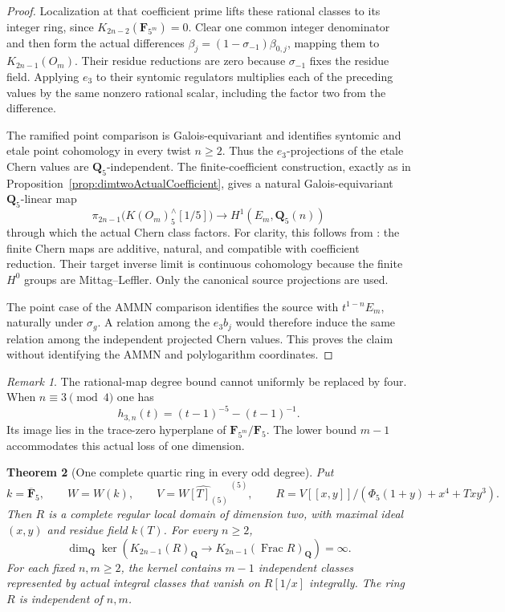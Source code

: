 \documentclass[11pt,a4paper]{article}
\newtheorem{theorem}{Theorem}[section]
\theoremstyle{remark}
\newtheorem{remark}[theorem]{Remark}
\begin{document}
\begin{proof}
Localization at that coefficient prime lifts these rational
classes to its integer ring, since
$K_{2n-2}(\mathbf F_{5^m})=0$.
Clear one common integer denominator and then form the actual
differences
$\beta_j=(1-\sigma_{-1})\beta_{0,j}$, mapping them to $K_{2n-1}(O_m)$.
Their residue reductions are zero because $\sigma_{-1}$ fixes
the residue field.  Applying $e_3$ to their syntomic regulators
multiplies each of the preceding values by the same nonzero
rational scalar, including the factor two from the difference.

The ramified point comparison
\cite[Example~2.2.4 and Propositions~2.2.7, 2.2.9, 2.3.4]{HuberKings}
is Galois-equivariant and identifies syntomic and etale point
cohomology in every twist $n\geq2$.  Thus the $e_3$-projections
of the etale Chern values are $\mathbf Q_5$-independent.
The finite-coefficient construction, exactly as in
Proposition~\ref{prop:dimtwoActualCoefficient}, gives a natural
Galois-equivariant $\mathbf Q_5$-linear map
\[
 \pi_{2n-1}\bigl(K(O_m)^\wedge_5[1/5]\bigr)
       \longrightarrow H^1(E_m,\mathbf Q_5(n))
\]
through which the actual Chern class factors.
For clarity, this follows from
\cite[Proposition~2.1.1, Lemma~2.3 and Propositions~2.4, 2.8]{WeibelChern}:
the finite Chern maps are additive, natural, and compatible with
coefficient reduction.  Their target inverse limit is continuous
cohomology because the finite $H^0$ groups are Mittag--Leffler.
Only the canonical source projections are used.

The point case of the AMMN comparison identifies the source with
$t^{1-n}E_m$, naturally under $\sigma_g$.  A relation among the
$e_3b_j$ would therefore induce the same relation among the
independent projected Chern values.  This proves the claim
without identifying the AMMN and polylogarithm coordinates.
\end{proof}

\begin{remark}
The rational-map degree bound cannot uniformly be replaced by four.
When $n\equiv3\pmod4$ one has
\[
 h_{3,n}(t)=(t-1)^{-5}-(t-1)^{-1}.
\]
Its image lies in the trace-zero hyperplane of
$\mathbf F_{5^m}/\mathbf F_5$.  The lower bound $m-1$ accommodates
this actual loss of one dimension.
\end{remark}

\begin{theorem}[One complete quartic ring in every odd degree]
\label{thm:dimtwoCompleteAllOddInfiniteRank}
Put
\[
 k=\overline{\mathbf F}_5,\qquad W=W(k),\qquad
 V=\widehat{W[T]_{(5)}}^{\,(5)},\qquad
 R=V[[x,y]]/(\Phi_5(1+y)+x^4+Txy^3).
\]
Then $R$ is a complete regular local domain of dimension two,
with maximal ideal $(x,y)$ and residue field $k(T)$.
For every $n\geq2$,
\[
 \dim_{\mathbf Q}\ker\left(
 K_{2n-1}(R)_{\mathbf Q}\longrightarrow
 K_{2n-1}(\operatorname{Frac}R)_{\mathbf Q}\right)=\infty.
\]
For each fixed $n,m\geq2$, the kernel contains $m-1$ independent
classes represented by actual integral classes that vanish on
$R[1/x]$ integrally.  The ring $R$ is independent of $n,m$.
\end{theorem}
\end{document}
